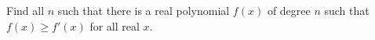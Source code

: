 Find all $n$ such that there is a real polynomial $f(x)$ of degree $n$ such that $f(x) \ge f'(x)$ for all real $x$.